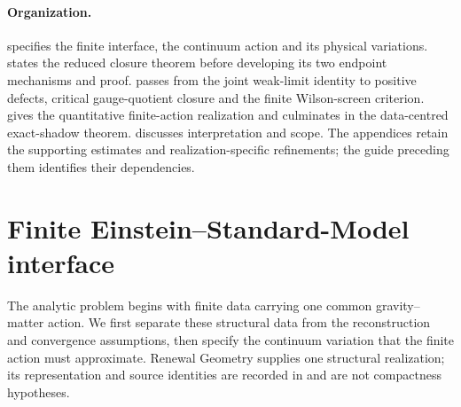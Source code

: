 \documentclass[11pt]{article}
\numberwithin{equation}{section}
\theoremstyle{definition}
\theoremstyle{remark}
\begin{document}
\paragraph{Organization.}

 specifies the finite interface, the continuum action and
its physical variations.  states the reduced closure theorem
before developing its two endpoint mechanisms and proof.
 passes from the joint weak-limit identity to positive
defects, critical gauge-quotient closure and the finite Wilson-screen
criterion.  gives the quantitative finite-action
realization and culminates in the data-centred exact-shadow theorem.
 discusses interpretation and scope.
The appendices retain the supporting estimates and realization-specific
refinements; the guide preceding them identifies their dependencies.

\section{Finite Einstein--Standard-Model interface}
\label{sec:interface}

The analytic problem begins with finite data carrying one common
gravity--matter action. We first separate these structural data from the
reconstruction and convergence assumptions, then specify the continuum
variation that the finite action must approximate. Renewal Geometry supplies
one structural realization; its representation and source identities are
recorded in  and are not compactness hypotheses.
\end{document}
